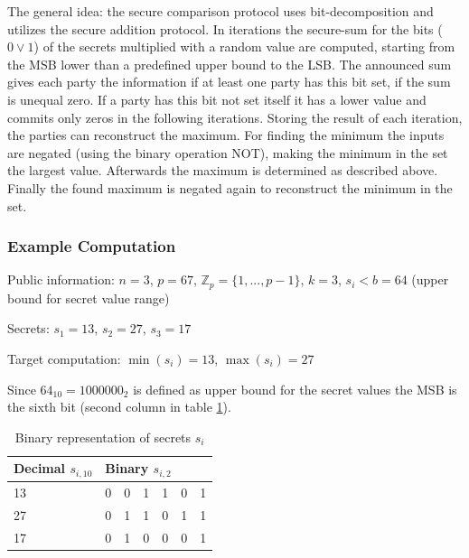 		The general idea: the secure comparison protocol uses bit-decomposition and utilizes the secure addition protocol. In iterations the secure-sum for the bits ($0 \lor 1$) of the secrets multiplied with a random value are computed, starting from the \gls{MSB} lower than a predefined upper bound to the \gls{LSB}. The announced sum gives each party the information if at least one party has this bit set, if the sum is unequal zero. If a party has this bit not set itself it has a lower value and commits only zeros in the following iterations. Storing the result of each iteration, the parties can reconstruct the maximum.
		For finding the minimum the inputs are negated (using the binary operation NOT), making the minimum in the set the largest value. Afterwards the maximum is determined as described above. Finally the found maximum is negated again to reconstruct the minimum in the set.
		
		\subsubsection{Example Computation}
		\label{Secure Comparison Example}
		
		Public information: $n=3$, $p=67$, $\mathbb{Z}_p=\{1,...,p-1\}$, $k=3$, $s_i<b=64$ (upper bound for secret value range) \par
		\noindent Secrets: $s_1=13$, $s_2=27$, $s_3=17$ \par
		
		\noindent Target computation: $\min(s_i)=13$, $\max(s_i)=27$
		
		Since $64_{10}=1000000_2$ is defined as upper bound for the secret values the \gls{MSB} is the sixth bit (second column in table \ref{table:secure maximum binary representation of secrets}).
		 
		\begin{table}[!htb]
			\centering
			\caption{Binary representation of secrets $s_i$}
			\label{table:secure maximum binary representation of secrets}
			\begin{tabular}{|l|l|l|l|l|l|l|}
				\hline
				Decimal $s_{i,10}$ & \multicolumn{6}{l|}{Binary $s_{i,2}$} \\ \hline
				13                 & 0    & 0    & 1    & 1    & 0   & 1   \\ \hline
				27                 & 0    & 1    & 1    & 0    & 1   & 1   \\ \hline
				17                 & 0    & 1    & 0    & 0    & 0   & 1   \\ \hline
			\end{tabular}
		\end{table}

